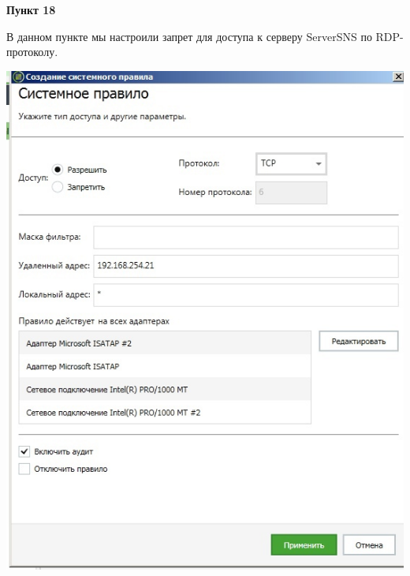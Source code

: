 \documentclass[a4paper,14pt]{extarticle}
\begin{document}
    \textbf{Пункт 18}
    \vspace{-3ex}
    \begin{center}
        \singlespacing
        В данном пункте мы настроили запрет для доступа к серверу ServerSNS по RDP-протоколу.

        \begin{multicols}{2}
            \includegraphics[scale=0.4]{pics/18_1.jpg}

\end{multicols}
\end{center}
\end{document}
